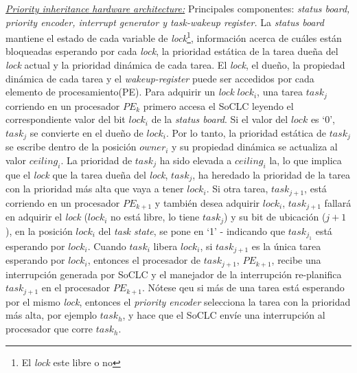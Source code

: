 \underline{\textit{Priority inheritance hardware architecture:}} Principales componentes: \textit{status board, priority encoder, interrupt generator \textnormal{y} task-wakeup register.} La \textit{status board} mantiene el estado de cada variable de \textit{lock}\footnote{El \textit{lock} este libre o no}, información acerca de cuáles están bloqueadas esperando por cada \textit{lock}, la prioridad estática de la tarea dueña del \textit{lock} actual y la prioridad dinámica de cada tarea. El \textit{lock}, el dueño, la propiedad dinámica de cada tarea y el \textit{wakeup-register} puede ser accedidos por cada elemento de procesamiento(PE). Para adquirir un \textit{lock} $lock_i$, una tarea $task_j$ corriendo en un procesador $PE_k$ primero accesa el SoCLC leyendo el correspondiente valor del bit $lock_i$ de la \textit{status board}. Si el valor del $lock$ es `0', $task_j$ se convierte en el dueño de $lock_i$. Por lo tanto, la prioridad estática de $task_j$ se escribe dentro de la posición $owner_i$ y su propiedad dinámica se actualiza al valor $ceiling_i$. La prioridad de $task_j$ ha sido elevada a $ceiling_i$ la, lo que implica que el \textit{lock} que la tarea dueña del \textit{lock}, $task_j$, ha heredado la prioridad de la tarea con la prioridad más alta que vaya a tener $lock_i$. Si otra tarea, $task_{j+1}$, está corriendo en un procesador $PE_{k+1}$ y también desea adquirir $lock_i$, $task_{j+1}$ fallará en adquirir el \textit{lock} ($lock_i$ no está libre, lo tiene $task_j$) y su bit de ubicación ($j+1$), en la posición $lock_i$ del \textit{task state}, se pone en `1' - indicando que $task_{j_1}$ está esperando por $lock_i$. Cuando $task_i$ libera $lock_i$, si $task_{j+1}$ es la única tarea esperando por $lock_i$, entonces el procesador de $task_{j+1}$, $PE_{k+1}$, recibe una interrupción generada por SoCLC y el manejador de la interrupción re-planifica $task_{j+1}$ en el procesador $PE_{k+1}$. Nótese qeu si más de una tarea está esperando por el mismo \textit{lock}, entonces el \textit{priority encoder} selecciona la tarea con la prioridad más alta, por ejemplo $task_h$, y hace que el SoCLC envíe una interrupción al procesador que corre $task_h$.

